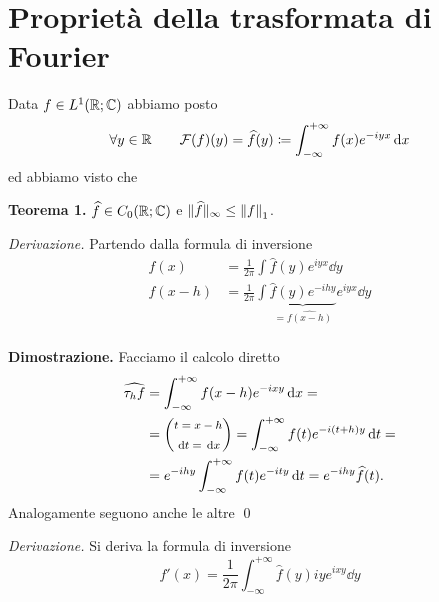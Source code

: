 \section{Proprietà della trasformata di Fourier}

Data $f \in L^1(\mathbb R; \mathbb C)$ abbiamo posto
$$
	\forall y \in \mathbb R
	\qquad 
	\mathcal F(f)(y) = \widehat f(y) \coloneqq \int_{-\infty}^{+\infty} f(x) e^{-iyx} \,\mathrm{d} x
$$
ed abbiamo visto che

\textbf{Teorema 1.}
$\widehat f \in C_0(\mathbb R; \mathbb C)$ e $\| \widehat f \|_\infty \leq \left\lVert f \right\rVert_1$.


\textit{Derivazione.}
Partendo dalla formula di inversione
$$
\begin{aligned}
	f(x) & = \frac{1}{2\pi} \int \hat f(y) e^{iyx} \dd y \\
	f(x - h) & = \frac{1}{2\pi} \int \underbrace{\hat f(y) e^{-ihy}}_{=\hat{f(x-h)}} e^{iyx} \dd y \\
\end{aligned}
$$

\textbf{Dimostrazione.}
Facciamo il calcolo diretto
$$
\begin{aligned}
	\widehat{\tau_h f}
	& = \int_{-\infty}^{+\infty} f(x - h) e^{-ixy} \,\mathrm{d} x =\\
	& = {\footnotesize \left(\begin{gathered} t = x - h \\ \,\mathrm{d} t = \,\mathrm{d} x \end{gathered}\right)} 
	= \int_{-\infty}^{+\infty} f(t) e^{-i(t + h)y} \,\mathrm{d} t = \\
	& = e^{-ihy} \int_{-\infty}^{+\infty} f(t) e^{-ity} \,\mathrm{d} t = e^{-ihy} \widehat f(t).
\end{aligned}
$$
Analogamente seguono anche le altre
\qed


\textit{Derivazione.} Si deriva la formula di inversione
$$
	f'(x) = \frac{1}{2\pi} \int_{-\infty}^{+\infty} \hat f(y) i y e^{ixy} \dd y
$$

